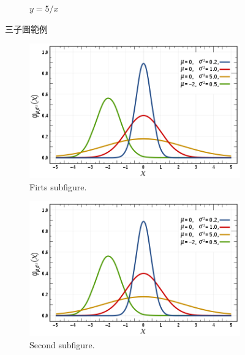 \begin{figure}[htbp]
\begin{subfigure}[b]{0.3\textwidth}
        \caption{$y=5/x$}
        \label{fig:five over x}
    \end{subfigure}
       \caption{三子圖範例}
       \label{fig:three graphs}
\end{figure}

\begin{figure}[htbp]
    \centering
    \begin{subfigure}{0.4\textwidth}
        \includegraphics[width=\textwidth]{figures/gambar.png}
        \caption{Firts subfigure.}
        \label{fig:first}
    \end{subfigure}
    \hfill
    \begin{subfigure}{0.4\textwidth}
        \includegraphics[width=\textwidth]{figures/gambar.png}
        \caption{Second subfigure.}
        \label{fig:second}
    \end{subfigure}
    \hfill
    \begin{subfigure}{0.4\textwidth}

\end{subfigure}
\end{figure}
